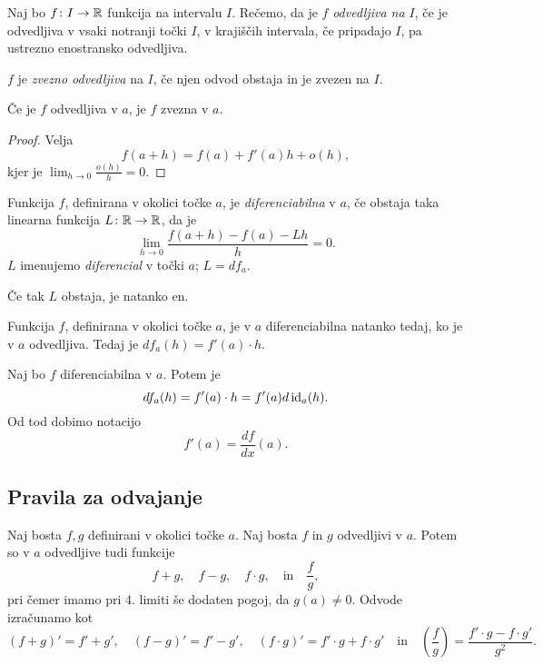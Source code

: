 \documentclass[12pt, a4paper]{article}
\begin{document}
\begin{definicija}
Naj bo $f\colon I\to\mathbb{R}$ funkcija na intervalu $I$. Rečemo, da je $f$ \emph{odvedljiva na $I$}, če je odvedljiva v vsaki notranji točki $I$, v krajiščih intervala, če pripadajo $I$, pa ustrezno enostransko odvedljiva.
\end{definicija}

\begin{definicija}
$f$ je \emph{zvezno odvedljiva} na $I$, če njen odvod obstaja in je zvezen na $I$.
\end{definicija}

\begin{trditev}
Če je $f$ odvedljiva v $a$, je $f$ zvezna v $a$.
\end{trditev}

\begin{proof}
Velja
\[
f(a+h)=f(a)+f'(a)h+o(h),
\]
kjer je $\displaystyle\lim_{h\to 0}\frac{o(h)}{h}=0$.
\end{proof}

\begin{definicija}
Funkcija $f$, definirana v okolici točke $a$, je \emph{diferenciabilna} v $a$, če obstaja taka linearna funkcija $L\colon\mathbb{R}\to\mathbb{R}$, da je
\[
\lim_{h\to 0}\frac{f(a+h)-f(a)-Lh}{h}=0.
\]
$L$ imenujemo \emph{diferencial} v točki $a$; $L=df_a$.
\end{definicija}

\begin{opomba}
Če tak $L$ obstaja, je natanko en.
\end{opomba}

\begin{trditev}
Funkcija $f$, definirana v okolici točke $a$, je v $a$ diferenciabilna natanko tedaj, ko je v $a$ odvedljiva. Tedaj je $df_a(h)=f'(a)\cdot h$.
\end{trditev}

\obvs

\begin{opomba}
Naj bo $f$ diferenciabilna v $a$. Potem je
\[
df_a(h)=f'(a)\cdot h=f'(a) d\operatorname{id}_a(h).
\]
Od tod dobimo notacijo
\[
f'(a)=\frac{df}{dx}(a).
\]
\end{opomba}

\newpage

\subsection{Pravila za odvajanje}

\begin{izrek}
Naj bosta $f,g$ definirani v okolici točke $a$. Naj bosta $f$ in $g$ odvedljivi v $a$. Potem so v $a$ odvedljive tudi funkcije
\[
f+g,\quad f-g,\quad f\cdot g,\quad\text{in}\quad \frac{f}{g},
\]
pri čemer imamo pri 4. limiti še dodaten pogoj, da $g(a)\ne 0$. Odvode izračunamo kot
\[
(f+g)'=f'+g',\quad (f-g)'=f'-g',\quad (f\cdot g)'=f'\cdot g+f\cdot g'\quad\text{in}\quad \left(\frac{f}{g}\right)=\frac{f'\cdot g-f\cdot g'}{g^2}.
\]
\end{izrek}
\end{document}
